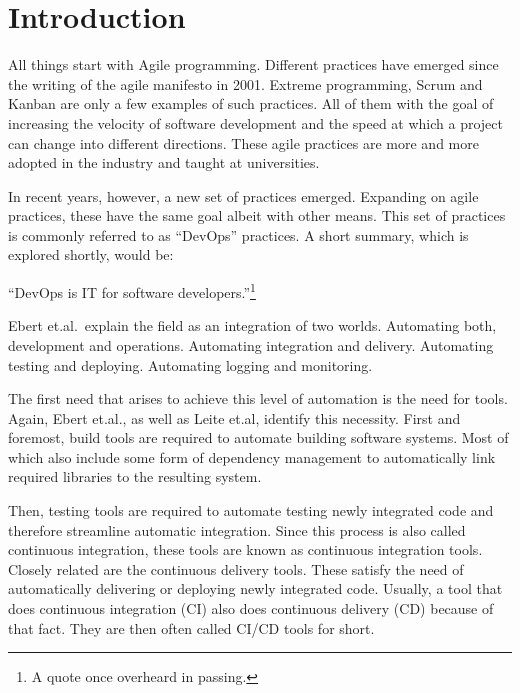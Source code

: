 \chapter{Introduction}
\label{ch:introduction}

All things start with Agile programming.
Different practices have emerged since the writing of the agile manifesto\cite{AgileManifesto} in 2001.
Extreme programming, Scrum and Kanban are only a few examples of such practices\cite{ADecadeOfAgileMethodologies}.
All of them with the goal of increasing the velocity of software development and the speed at which a project can change into different directions.
These agile practices are more and more adopted in the industry\cite{BecomingAgileTogether} and taught at universities\cite{StudienhandbuchProjectManagement}.

In recent years, however, a new set of practices emerged.
Expanding on agile practices, these have the same goal albeit with other means.
This set of practices is commonly referred to as ``DevOps'' practices.
A short summary, which is explored shortly, would be:

``DevOps is IT for software developers.''\footnote{A quote once overheard in passing.}

Ebert et.al.\ explain the field as an integration of two worlds\cite{DevOps}.
Automating both, development and operations.
Automating integration and delivery.
Automating testing and deploying.
Automating logging and monitoring.

The first need that arises to achieve this level of automation is the need for tools.
Again, Ebert et.al., as well as Leite et.al, identify this necessity\cite{DevOps, ASurveyofDevOpsConceptsandChallenges}.
First and foremost, build tools are required to automate building software systems.
Most of which also include some form of dependency management to automatically link required libraries to the resulting system.

Then, testing tools are required to automate testing newly integrated code and therefore streamline automatic integration.
Since this process is also called continuous integration, these tools are known as continuous integration tools\cite{DevOps}.
Closely related are the continuous delivery tools.
These satisfy the need of automatically delivering or deploying newly integrated code.
Usually, a tool that does continuous integration (CI) also does continuous delivery (CD) because of that fact.
They are then often called CI/CD tools for short.


